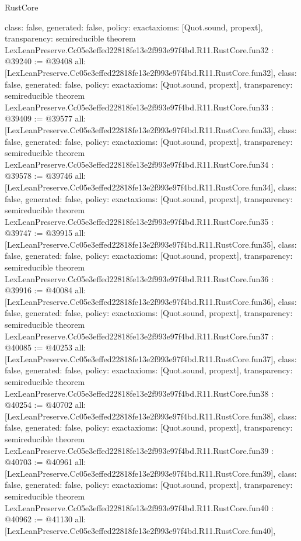 \begin{lexlean}{RustCore}
\begin{coremodule}
{  class: false,
  generated: false,
  policy: exact{axioms: [Quot.sound, propext]},
  transparency: semireducible
}
theorem LexLeanPreserve.Cc05e3effed22818fe13e2f993e97f4bd.R11.RustCore.fun32 : @39240 := @39408 {
  all: [LexLeanPreserve.Cc05e3effed22818fe13e2f993e97f4bd.R11.RustCore.fun32],
  class: false,
  generated: false,
  policy: exact{axioms: [Quot.sound, propext]},
  transparency: semireducible
}
theorem LexLeanPreserve.Cc05e3effed22818fe13e2f993e97f4bd.R11.RustCore.fun33 : @39409 := @39577 {
  all: [LexLeanPreserve.Cc05e3effed22818fe13e2f993e97f4bd.R11.RustCore.fun33],
  class: false,
  generated: false,
  policy: exact{axioms: [Quot.sound, propext]},
  transparency: semireducible
}
theorem LexLeanPreserve.Cc05e3effed22818fe13e2f993e97f4bd.R11.RustCore.fun34 : @39578 := @39746 {
  all: [LexLeanPreserve.Cc05e3effed22818fe13e2f993e97f4bd.R11.RustCore.fun34],
  class: false,
  generated: false,
  policy: exact{axioms: [Quot.sound, propext]},
  transparency: semireducible
}
theorem LexLeanPreserve.Cc05e3effed22818fe13e2f993e97f4bd.R11.RustCore.fun35 : @39747 := @39915 {
  all: [LexLeanPreserve.Cc05e3effed22818fe13e2f993e97f4bd.R11.RustCore.fun35],
  class: false,
  generated: false,
  policy: exact{axioms: [Quot.sound, propext]},
  transparency: semireducible
}
theorem LexLeanPreserve.Cc05e3effed22818fe13e2f993e97f4bd.R11.RustCore.fun36 : @39916 := @40084 {
  all: [LexLeanPreserve.Cc05e3effed22818fe13e2f993e97f4bd.R11.RustCore.fun36],
  class: false,
  generated: false,
  policy: exact{axioms: [Quot.sound, propext]},
  transparency: semireducible
}
theorem LexLeanPreserve.Cc05e3effed22818fe13e2f993e97f4bd.R11.RustCore.fun37 : @40085 := @40253 {
  all: [LexLeanPreserve.Cc05e3effed22818fe13e2f993e97f4bd.R11.RustCore.fun37],
  class: false,
  generated: false,
  policy: exact{axioms: [Quot.sound, propext]},
  transparency: semireducible
}
theorem LexLeanPreserve.Cc05e3effed22818fe13e2f993e97f4bd.R11.RustCore.fun38 : @40254 := @40702 {
  all: [LexLeanPreserve.Cc05e3effed22818fe13e2f993e97f4bd.R11.RustCore.fun38],
  class: false,
  generated: false,
  policy: exact{axioms: [Quot.sound, propext]},
  transparency: semireducible
}
theorem LexLeanPreserve.Cc05e3effed22818fe13e2f993e97f4bd.R11.RustCore.fun39 : @40703 := @40961 {
  all: [LexLeanPreserve.Cc05e3effed22818fe13e2f993e97f4bd.R11.RustCore.fun39],
  class: false,
  generated: false,
  policy: exact{axioms: [Quot.sound, propext]},
  transparency: semireducible
}
theorem LexLeanPreserve.Cc05e3effed22818fe13e2f993e97f4bd.R11.RustCore.fun40 : @40962 := @41130 {
  all: [LexLeanPreserve.Cc05e3effed22818fe13e2f993e97f4bd.R11.RustCore.fun40],
}
\end{coremodule}
\end{lexlean}
